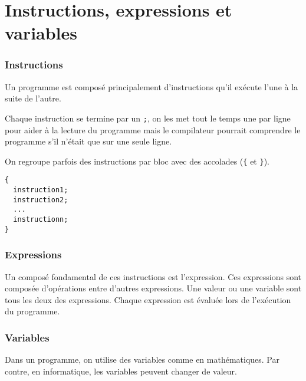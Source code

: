 

\usepackage{color}
\usepackage[usenames,dvipsnames,svgnames,table]{xcolor}

\usepackage{appendix}

\usepackage{listings}
\usepackage{numprint}



\part{Instructions, expressions et variables}

\section{Instructions}
Un programme est composé principalement d'instructions qu'il exécute l'une à la
suite de l'autre.

Chaque instruction se termine par un \verb|;|, on les met tout le temps
une par ligne pour aider à la lecture du programme mais le compilateur
pourrait comprendre le programme s'il n'était que sur une seule ligne.

On regroupe parfois des instructions par bloc avec des accolades
(\verb|{| et \verb|}|).
\begin{lstlisting}
{
  instruction1;
  instruction2;
  ...
  instructionn;
}
\end{lstlisting}

\section{Expressions}

Un composé fondamental de ces instructions est l'expression.
Ces expressions sont composée d'opérations entre d'autres expressions.
Une valeur ou une variable sont tous les deux des expressions.
Chaque expression est évaluée lors de l'exécution du programme.

\section{Variables}
Dans un programme, on utilise des variables comme en mathématiques.
Par contre, en informatique, les variables peuvent changer de valeur.

